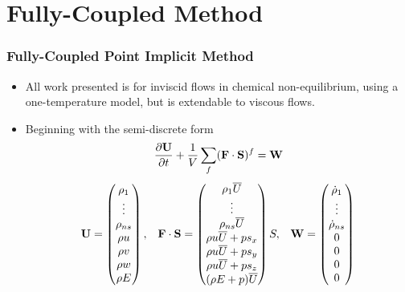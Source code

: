\documentclass{beamer}
\begin{document}
\section{Fully-Coupled Method}
\begin{frame}
  \frametitle{Fully-Coupled Point Implicit Method}
  \begin{itemize}
    \item All work presented is for inviscid flows in chemical non-equilibrium,
      using a one-temperature model, but is extendable to viscous flows.
    \item Beginning with the semi-discrete form
    \begin{equation*}
    	\label{inv_flux_fv}
    	\frac{\partial {\bf U}}{\partial t}
    	 + \frac{1}{V}\sum\limits_{f}({\bf F}\cdot{\bf S})^f = {\bf W}
    \end{equation*}
    \begin{equation*}
    	\begin{matrix}
    	{\bf U}=\begin{pmatrix}
       		\rho_1\\
    		\vdots \\
    		\rho_{ns} \\
    		\rho u \\
    		\rho v \\
    		\rho w \\
    		\rho E \\
    	\end{pmatrix},      &
     	\mathbf{F \cdot S} = \begin{pmatrix}
    		\rho_1  \overline{U} \\
    		\vdots \\
    		\rho_{ns} \overline{U} \\
    		\rho u \overline{U} + p s_x\\
    		\rho u \overline{U} + p s_y\\
    		\rho u \overline{U} + p s_z\\
    		(\rho E + p) \overline{U} \\
    	\end{pmatrix}S,    &
     	{\bf W} = \begin{pmatrix}
        \dot\rho_1\\
    		\vdots \\
    		\dot\rho_{ns} \\
        0 \\
        0 \\
        0 \\
        0
      \end{pmatrix}

  	\end{matrix}
  \end{equation*}

  \end{itemize}
\end{frame}
\end{document}
